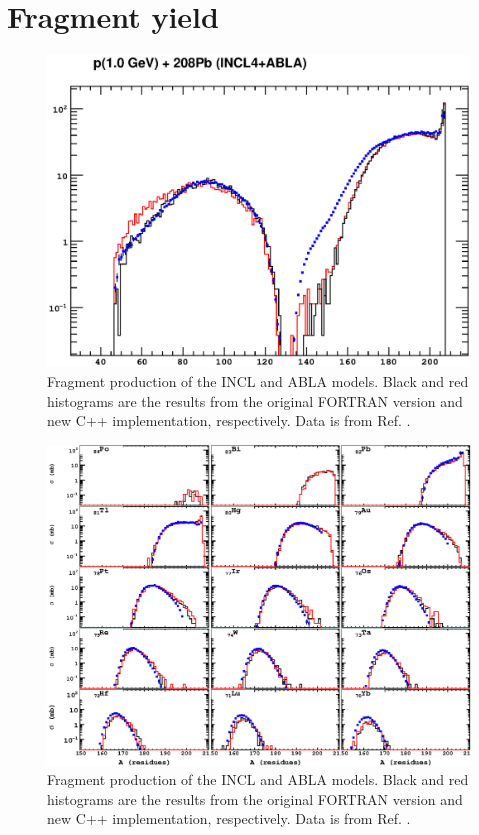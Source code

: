 \documentclass[a4paper]{jpconf}
\begin{document}
\section{Fragment yield}

\begin{figure}[h]
\begin{center}
\includegraphics[scale=0.70]{poster/images/fragments.eps}

\caption{Fragment production of the INCL and ABLA \cite{abla, abla1, abla2} models. 
Black and red histograms are the results from the original FORTRAN version 
and new C++ implementation, respectively. Data is from Ref. \cite{gsifragments}.}

\end{center}
\end{figure}


\begin{figure}[h]
\begin{center}
\includegraphics[scale=0.60]{poster/images/pPbIsotopes.eps}

\caption{Fragment production of the INCL and ABLA \cite{abla, abla1, abla2} models. 
Black and red histograms are the results from the original FORTRAN version 
and new C++ implementation, respectively. Data is from Ref. \cite{gsifragments}.}

\end{center}
\end{figure}
\end{document}
